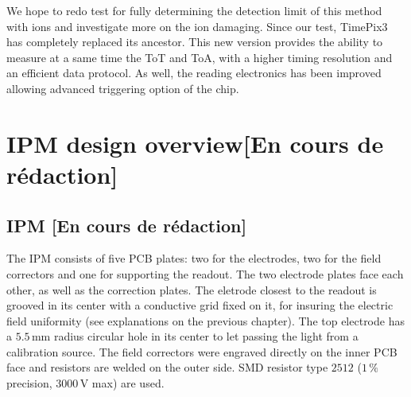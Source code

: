 \begin{refsection}
  We hope to redo test for fully determining the detection limit of this method with ions and investigate more on the ion damaging.
  Since our test, TimePix3 has completely replaced its ancestor. This new version provides the ability to measure at a same time the ToT and ToA, with a higher timing resolution and an efficient data protocol. As well, the reading electronics has been improved allowing advanced triggering option of the chip.



  \section{IPM design overview[En cours de rédaction]}
  \subsection{IPM [En cours de rédaction]}
  
  The IPM consists of five PCB plates: two for the electrodes, two for the field correctors and one for supporting the readout. The two electrode plates face each other, as well as the correction plates. The eletrode closest to the readout is grooved in its center with a conductive grid fixed on it, for insuring the electric field uniformity (see explanations on the previous chapter). The top electrode has a $5.5\,\mathrm{mm}$ radius circular hole in its center to let passing the light from a calibration source. The field correctors were engraved directly on the inner PCB face and resistors are welded on the outer side. SMD resistor type $2512$ ($1\,\mathrm{\%}$ precision, $3000\,\mathrm{V}$ max) are used.


\end{refsection}
